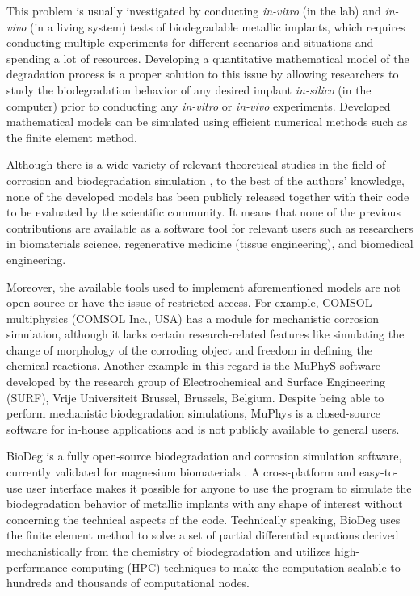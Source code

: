 This problem is usually investigated by conducting \textit{in-vitro} (in the lab) and \textit{in-vivo} (in a living system) tests of biodegradable metallic implants, which requires conducting multiple experiments for different scenarios and situations and spending a lot of resources. Developing a quantitative mathematical model of the degradation process is a proper solution to this issue by allowing researchers to study the biodegradation behavior of any desired implant \textit{in-silico} (in the computer) prior to conducting any \textit{in-vitro} or \textit{in-vivo} experiments. Developed mathematical models can be simulated using efficient numerical methods such as the finite element method.

Although there is a wide variety of relevant theoretical studies in the field of corrosion and biodegradation simulation \cite{Gastaldi2011, Wilder2014, Grogan2014, Bajger2016, Dolgikh2019, Hoche2014, SanzHerrera2018}, to the best of the authors' knowledge, none of the developed models has been publicly released together with their code to be evaluated by the scientific community. It means that none of the previous contributions are available as a software tool for relevant users such as researchers in biomaterials science, regenerative medicine (tissue engineering), and biomedical engineering.

Moreover, the available tools used to implement aforementioned models are not open-source or have the issue of restricted access. For example, COMSOL multiphysics (COMSOL Inc., USA) has a module for mechanistic corrosion simulation, although it lacks certain research-related features like simulating the change of morphology of the corroding object and freedom in defining the chemical reactions. Another example in this regard is the MuPhyS software \cite{Dolgikh2019, Christoph2021} developed by the research group of Electrochemical and Surface Engineering (SURF), Vrije Universiteit Brussel, Brussels, Belgium. Despite being able to perform mechanistic biodegradation simulations, MuPhys is a closed-source software for in-house applications and is not publicly available to general users.

BioDeg is a fully open-source biodegradation and corrosion simulation software, currently validated for magnesium biomaterials \cite{Barzegari2021}. A cross-platform and easy-to-use user interface makes it possible for anyone to use the program to simulate the biodegradation behavior of metallic implants with any shape of interest without concerning the technical aspects of the code. Technically speaking, BioDeg uses the finite element method to solve a set of partial differential equations derived mechanistically from the chemistry of biodegradation and utilizes high-performance computing (\gls{HPC}) techniques to make the computation scalable to hundreds and thousands of computational nodes.


